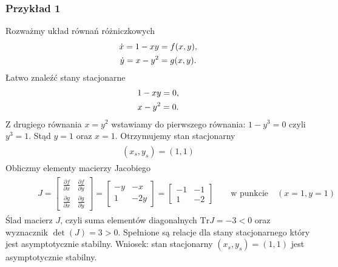 \documentclass[a4paper,12pt,polish]{sphinxmanual}
\begin{document}
\subsubsection{Przykład 1}
\label{ch1/chI023:przyklad-1}
Rozważmy układ równań różniczkowych
\label{ch1/chI023:equation-eqn47}\begin{gather}
\begin{split}\dot x= 1-xy = f(x, y),\end{split}\label{ch1/chI023-eqn47}\\\begin{split}\dot y = x-y^2 = g(x, y).\end{split}\notag
\end{gather}
Łatwo znaleźć stany stacjonarne
\label{ch1/chI023:equation-eqn48}\begin{gather}
\begin{split} 1-xy = 0,\end{split}\label{ch1/chI023-eqn48}\\\begin{split} x-y^2 = 0.\end{split}\notag
\end{gather}
Z drugiego równania $x=y^2$ wstawiamy do pierwszego równania: $1-y^3=0$ czyli $y^3=1$. Stąd $y=1$ oraz $x=1$. Otrzymujemy stan stacjonarny
\label{ch1/chI023:equation-eqn49}\begin{gather}
\begin{split}(x_s, y_s) = (1, 1)\end{split}\label{ch1/chI023-eqn49}
\end{gather}
Obliczmy elementy macierzy Jacobiego
\label{ch1/chI023:equation-eqn50}\begin{gather}
\begin{split} \qquad \quad J = \begin{bmatrix}\frac{ \partial f}{\partial x}& \frac{\partial f}{\partial y}\\ \frac{\partial g}{\partial x}& \frac{\partial g}{\partial y}  \end{bmatrix}  =   \begin{bmatrix}-y & -x \\ 1& -2y  \end{bmatrix}    =  \begin{bmatrix}-1 & -1 \\ 1& -2  \end{bmatrix}\qquad \mbox{w punkcie} \quad (x=1, y=1)\end{split}\label{ch1/chI023-eqn50}
\end{gather}
Ślad macierz $J$, czyli suma elementów diagonalnych $\mbox{Tr} J = -3 < 0$ oraz wyznacznik $\det(J) = 3 > 0$. Spełnione są relacje dla stany stacjonarnego który jest asymptotycznie stabilny. Wniosek: stan stacjonarny $(x_s, y_s) = (1, 1)$ jest asymptotycznie stabilny.
\end{document}
